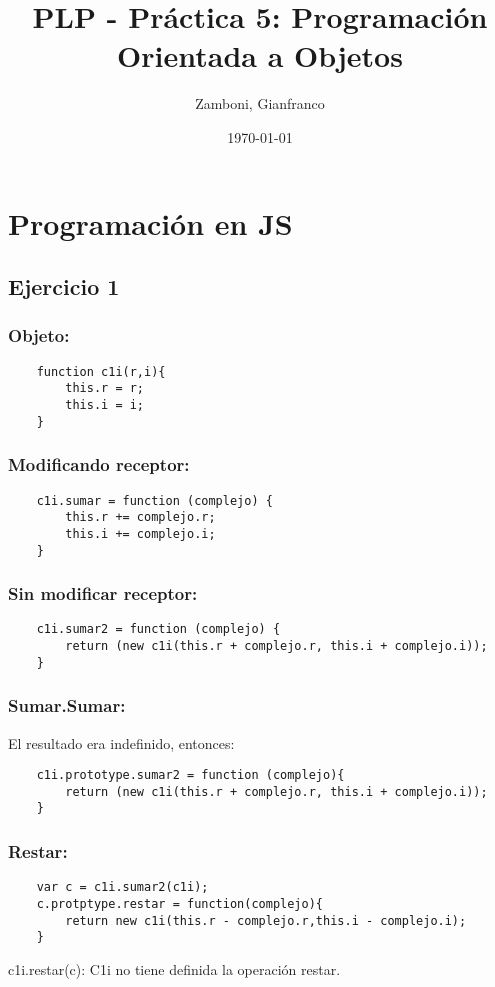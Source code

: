 \documentclass[10pt,a4paper]{article}
\begin{document}
\title{PLP - Práctica 5: Programación Orientada a Objetos}

\date{\today}

\author{Zamboni, Gianfranco}

\maketitle
\setcounter{page}{1}

\section*{\centering Programación en JS}
\subsection{Ejercicio 1}
\subsubsection{Objeto:}
    \begin{lstlisting}
    function c1i(r,i){
    	this.r = r;
    	this.i = i;
    }
    \end{lstlisting}
\subsubsection{Modificando receptor:}
    \begin{lstlisting}
    c1i.sumar = function (complejo) {
    	this.r += complejo.r;
    	this.i += complejo.i;
    }
    \end{lstlisting}
\subsubsection{Sin modificar receptor:}
    \begin{lstlisting}
    c1i.sumar2 = function (complejo) {
    	return (new c1i(this.r + complejo.r, this.i + complejo.i));
    }
    \end{lstlisting}
\subsubsection{Sumar.Sumar:}
    El resultado era indefinido, entonces:
    \begin{lstlisting}
    c1i.prototype.sumar2 = function (complejo){
    	return (new c1i(this.r + complejo.r, this.i + complejo.i));
    }
    \end{lstlisting}
\subsubsection{Restar:}
    \begin{lstlisting}
    var c = c1i.sumar2(c1i);
    c.protptype.restar = function(complejo){
    	return new c1i(this.r - complejo.r,this.i - complejo.i);	
    }
    \end{lstlisting}
    c1i.restar(c): C1i no tiene definida la operación restar.
\end{document}
